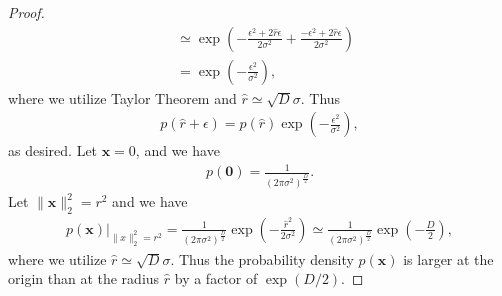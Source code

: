 \documentclass[11pt]{article}
\theoremstyle{definition}
\begin{document}
\begin{proof}
\begin{align*}
&\simeq \exp\left(-\frac{\epsilon^2+2\hat{r}\epsilon}{2\sigma^2} + \frac{-\epsilon^2+2\hat{r}\epsilon}{2\sigma^2}\right) \\
&= \exp\left(-\frac{\epsilon^2}{\sigma^2}\right),
\end{align*}
where we utilize Taylor Theorem and $\hat{r} \simeq \sqrt{D}\sigma$. Thus
\begin{align*}
p(\hat{r}+\epsilon) = p(\hat{r})\exp\left(-\frac{\epsilon^2}{\sigma^2}\right) ,
\end{align*}
as desired. Let $\textbf{x} = 0$, and we have
\begin{align*}
p(\textbf{0}) = \frac{1}{(2\pi\sigma^2)^\frac{D}{2}}.
\end{align*}
Let $\lVert\textbf{x}\rVert_2^2 = r^2$ and we have
\begin{align*}
p(\textbf{x})\bigg|_{\lVert x\lVert_2^2 = r^2} =  \frac{1}{(2\pi\sigma^2)^\frac{D}{2}}\exp\left(-\frac{\hat{r}^2}{2\sigma^2}\right) \simeq \frac{1}{(2\pi\sigma^2)^\frac{D}{2}}\exp\left(-\frac{D}{2}\right),
\end{align*}
where we utilize $\hat{r} \simeq \sqrt{D}\sigma$. Thus the probability density $p(\textbf{x})$ is larger at the origin than at the radius $\hat{r}$ by a factor of $\exp(D/2)$.
\end{proof}
\end{document}
